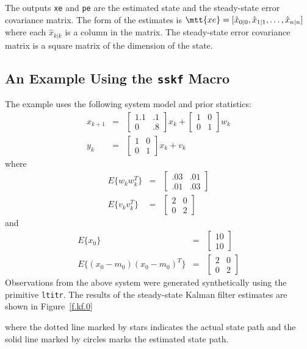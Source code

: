 	The outputs {\tt xe} and {\tt pe} are the estimated state
and the steady-state error covariance matrix.  The form of the
estimates is $\mtt{ xe}=[\hat{x}_{0|0},\hat{x}_{1|1},\ldots,\hat{x}_{n|n}]$
where each $\hat{x}_{k|k}$ is a column in the matrix.  The
steady-state error covariance matrix is a square matrix of the
dimension of the state.

\subsection{An Example Using the {\tt sskf} Macro}
	The example uses the following system model and prior 
statistics:
%
\begin{eqnarray}
x_{k+1}&=&\left[\begin{array}{cc}
              1.1 & .1\\
              0   & .8\end{array}\right]x_k+
         \left[\begin{array}{cc}
              1 & 0\\
              0 & 1\end{array}\right]w_k\nonumber\\
y_k&=&\left[\begin{array}{cc}
              1 & 0\\
              0 & 1\end{array}\right]x_k+v_k\nonumber
\end{eqnarray}
%
where
%
\begin{eqnarray}
E\{w_kw_k^T\}&=&\left[\begin{array}{cc}
              .03 & .01\\
              .01 & .03\end{array}\right]\nonumber\\
E\{v_kv_k^T\}&=&\left[\begin{array}{cc}
              2 & 0\\
              0 & 2\end{array}\right]\nonumber
\end{eqnarray}
%
and
%
\begin{eqnarray}
E\{x_0\}&=&\left[\begin{array}{c}
              10\\
              10\end{array}\right]\nonumber\\
E\{(x_0-m_0)(x_0-m_0)^T\}&=&\left[\begin{array}{cc}
              2 & 0\\
              0 & 2\end{array}\right]\nonumber
\end{eqnarray}
%
Observations from the above system were generated synthetically
using the primitive {\tt ltitr}.
The results of the steady-state Kalman filter estimates 
are shown in Figure~\ref{f.kf.0}
%

%
where the dotted line marked by stars indicates
the actual state path and the solid line marked
by circles marks the estimated state path.

